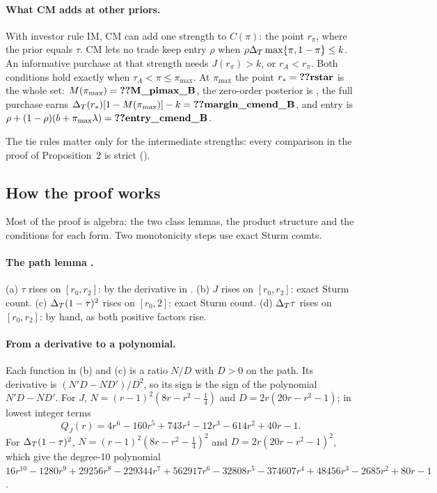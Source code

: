 \paragraph{What CM adds at other priors.} With investor rule IM, CM can add one strength to \(C(\pi)\): the point \(r_\pi\), where the prior equals
\(\tau\). CM lets no trade keep entry \(\rho\) when \(\rho\Delta_T\max\{\pi,1-\pi\}\le k\).
An informative purchase at that strength needs \(J(r_\pi)>k\), or \(r_A<r_\pi\).
Both conditions hold exactly
when \(\tau_A<\pi\le\pi_{\max}\). At \(\pi_{\max}\) the point \(r_*=\reg{rstar}\) is the whole set: \(M(\pi_{\max})=\reg{M_pimax_B}\),
the zero-order posterior is , the full purchase earns \(\DT(r_*)[1-M(\pi_{\max})]-k=\reg{margin_cmend_B}\),
and entry is \(\rho+(1-\rho)(b+\pi_{\max}\lambda)=\reg{entry_cmend_B}\).

The tie rules matter only for the intermediate strengths: every comparison in the proof of Proposition~2 is strict
().

\subsection{How the proof works}\label{sec:08_coexistence-proof}

Most of the proof is algebra: the two class lemmas, the product structure and the conditions for each form. Two monotonicity steps use exact Sturm counts.

\paragraph{The path lemma .} (a) \(\tau\) rises on \([r_0,r_2]\): by the derivative in . (b) \(J\) rises on \([r_0,r_2]\): exact Sturm count. (c)
\(\Delta_T(1-\tau)^2\) rises on \([r_0,2]\): exact Sturm count. (d) \(\Delta_T\tau\) rises on \([r_0,r_2]\): by hand, as both
positive factors rise.

\paragraph{From a derivative to a polynomial.} Each function in (b) and (c) is a ratio \(N/D\) with \(D>0\) on the path.
Its derivative is \((N'D-ND')/D^2\), so its sign is the sign of the polynomial \(N'D-ND'\). For \(J\),
\(N=(r-1)^2(8r-r^2-\tfrac14)\) and \(D=2r(20r-r^2-1)\); in lowest integer terms
\[
Q_J(r)=4r^6-160r^5+743r^4-12r^3-614r^2+40r-1 .
\]
For \(\Delta_T(1-\tau)^2\), \(N=(r-1)^2(8r-r^2-\tfrac14)^2\) and \(D=2r(20r-r^2-1)^2\), which give the degree-10 polynomial
\(16r^{10}-1280r^9+29256r^8-229344r^7+562917r^6-32808r^5-374607r^4+48456r^3-2685r^2+80r-1\).


